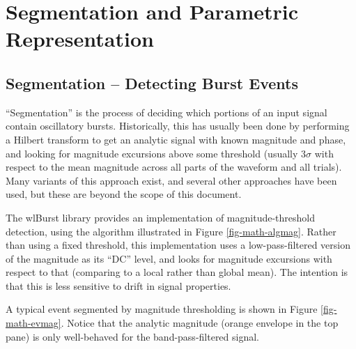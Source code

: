
\chapter{Segmentation and Parametric Representation}
\label{sect-math}

%
%
%
\section{Segmentation -- Detecting Burst Events}
\label{sect-math-segment}

``Segmentation'' is the process of deciding which portions of an input
signal contain oscillatory bursts. Historically, this has usually been done
by performing a Hilbert transform to get an analytic signal with known
magnitude and phase, and looking for magnitude excursions above some
threshold (usually $3\sigma$ with respect to the mean magnitude across all
parts of the waveform and all trials). Many variants of this approach exist,
and several other approaches have been used, but these are beyond the scope
of this document.

The wlBurst library provides an implementation of magnitude-threshold
detection, using the algorithm illustrated in Figure \ref{fig-math-algmag}.
Rather than using a fixed threshold, this implementation uses a
low-pass-filtered version of the magnitude as its ``DC'' level, and looks
for magnitude excursions with respect to that (comparing to a local rather
than global mean). The intention is that this is less sensitive to drift
in signal properties.

A typical event segmented by magnitude thresholding is shown in Figure
\ref{fig-math-evmag}. Notice that the analytic magnitude (orange envelope
in the top pane) is only well-behaved for the band-pass-filtered signal.

